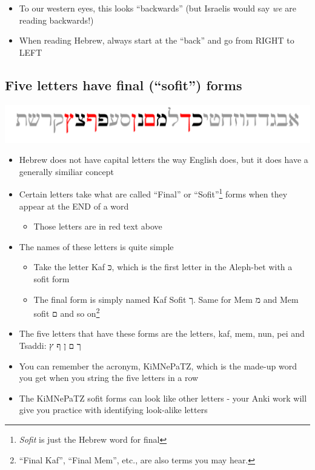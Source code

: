 \documentclass[
]{turabian-researchpaper}
\providecommand{\tightlist}{%
  \setlength{\itemsep}{0pt}\setlength{\parskip}{0pt}}
\begin{document}
\begin{itemize}
\tightlist
\item
  To our western eyes, this looks ``backwards'' (but Israelis would say \emph{we} are reading backwards!)
\item
  When reading Hebrew, always start at the ``back'' and go from RIGHT to LEFT
\end{itemize}

\hypertarget{one_3}{%
\subsection{Five letters have final (``sofit'') forms}\label{one_3}}

\begin{center}\includegraphics[width=500pt]{images/kimnepatz} \end{center}

\begin{itemize}
\tightlist
\item
  Hebrew does not have capital letters the way English does, but it does have a generally similiar concept
\item
  Certain letters take what are called ``Final'' or ``Sofit''\footnote{\emph{Sofit} is just the Hebrew word for final} forms when they appear at the END of a word

  \begin{itemize}
  \tightlist
  \item
    Those letters are in red text above
  \end{itemize}
\item
  The names of these letters is quite simple

  \begin{itemize}
  \tightlist
  \item
    Take the letter Kaf כּ, which is the first letter in the Aleph-bet with a sofit form
  \item
    The final form is simply named Kaf Sofit ך. Same for Mem מ and Mem sofit ם and so on\footnote{``Final Kaf'', ``Final Mem'', etc., are also terms you may hear.}
  \end{itemize}
\item
  The five letters that have these forms are the letters, kaf, mem, nun, pei and Tsaddi: ך ם ן ף ץ
\item
  You can remember the acronym, KiMNePaTZ, which is the made-up word you get when you string the five letters in a row
\item
  The KiMNePaTZ sofit forms can look like other letters - your Anki work will give you practice with identifying look-alike letters
\end{itemize}
\end{document}
